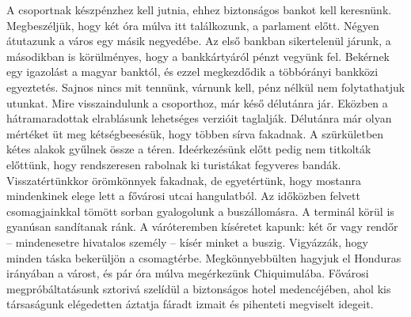 A csoportnak készpénzhez kell jutnia, ehhez biztonságos bankot
kell keresnünk. Megbeszéljük, hogy két óra múlva itt találkozunk,
a parlament előtt. Négyen átutazunk a város egy másik negyedébe. Az
első bankban sikertelenül járunk, a másodikban is körülményes, hogy
a bankkártyáról pénzt vegyünk fel. Bekérnek egy igazolást a magyar
banktól, és ezzel megkezdődik a többórányi bankközi egyeztetés.
Sajnos nincs mit tennünk, várnunk kell, pénz nélkül nem folytathatjuk
utunkat. Mire visszaindulunk a csoporthoz, már késő délutánra jár.
Eközben a hátramaradottak elrablásunk lehetséges verzióit taglalják.
Délutánra már olyan mértéket üt meg kétségbeesésük, hogy többen
sírva fakadnak. A szürkületben kétes alakok gyűlnek össze a téren.
Ideérkezésünk előtt pedig nem titkolták előttünk, hogy rendszeresen
rabolnak ki turistákat fegyveres bandák. Visszatértünkkor örömkönnyek
fakadnak, de egyetértünk, hogy mostanra mindenkinek elege
lett a fővárosi utcai hangulatból. Az időközben felvett csomagjainkkal
tömött sorban gyalogolunk a buszállomásra. A terminál körül is
gyanúsan sandítanak ránk. A váróteremben kíséretet kapunk: két őr
vagy rendőr -- mindenesetre hivatalos személy -- kísér minket a buszig.
Vigyázzák, hogy minden táska bekerüljön a csomagtérbe. Megkönnyebbülten
hagyjuk el Honduras irányában a várost, és pár óra múlva
megérkezünk Chiquimulába. Fővárosi megpróbáltatásunk sztorivá
szelídül a biztonságos hotel medencéjében, ahol kis társaságunk
elégedetten áztatja fáradt izmait és pihenteti megviselt idegeit.


